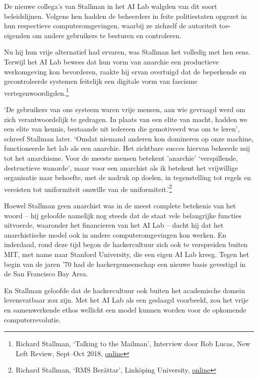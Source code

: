 \documentclass[
  a5paper,
  smalldemyvopaper,11pt,twoside,onecolumn,openright,extrafontsizes]{memoir}
\begin{document}
De nieuwe collega's van Stallman in het AI Lab walgden van dit soort
beleidslijnen. Volgens hen hadden de beheerders in feite politiestaten
opgezet in hun respectieve computeromgevingen, waarbij ze zichzelf de
autoriteit toe-eigenden om andere gebruikers te besturen en controleren.

Nu hij hun vrije alternatief had ervaren, was Stallman het volledig met
hen eens. Terwijl het AI Lab bewees dat hun vorm van anarchie een
productieve werkomgeving kon bevorderen, raakte hij ervan overtuigd dat
de beperkende en gecontroleerde systemen feitelijk een digitale vorm van
fascisme vertegenwoordigden.\footnote{\hspace{0pt}Richard Stallman,
  `Talking to the Mailman', Interview door Rob Lucas, New Left Review,
  Sept--Oct 2018,
  \href{https://newleftreview.org/issues/ii113/articles/richard-stallman-talking-to-the-mailman}{online}}

`De gebruikers van ons systeem waren vrije mensen, aan wie gevraagd werd
om zich verantwoordelijk te gedragen. In plaats van een elite van macht,
hadden we een elite van kennis, bestaande uit iedereen die gemotiveerd
was om te leren', schreef Stallman later. `Omdat niemand anderen kon
domineren op onze machine, functioneerde het lab als een anarchie. Het
zichtbare succes hiervan bekeerde mij tot het anarchisme. Voor de meeste
mensen betekent 'anarchie' `verspillende, destructieve wanorde', maar
voor een anarchist als ik betekent het vrijwillige organisatie naar
behoefte, met de nadruk op doelen, in tegenstelling tot regels en
vereisten tot uniformiteit omwille van de uniformiteit.'\footnote{\hspace{0pt}Richard
  Stallman, `RMS Berättar', Linköping University,
  \href{http://www.lysator.liu.se/history/garb/txt/87-2-rms.txt}{online}}

Hoewel Stallman geen anarchist was in de meest complete betekenis van
het woord -- hij geloofde namelijk nog steeds dat de staat vele
belangrijke functies uitvoerde, waaronder het financieren van het AI Lab
-- dacht hij dat het anarchistische model ook in andere
computeromgevingen kon werken. En inderdaad, rond deze tijd begon de
hackercultuur zich ook te verspreiden buiten MIT, met name naar Stanford
University, die een eigen AI Lab kreeg. Tegen het begin van de jaren '70
had de hackergemeenschap een nieuwe basis gevestigd in de San Francisco
Bay Area.

En Stallman geloofde dat de hackercultuur ook buiten het academische
domein levensvatbaar zou zijn. Met het AI Lab als een geslaagd
voorbeeld, zou het vrije en samenwerkende ethos wellicht een model
kunnen worden voor de opkomende computerrevolutie.
\end{document}
